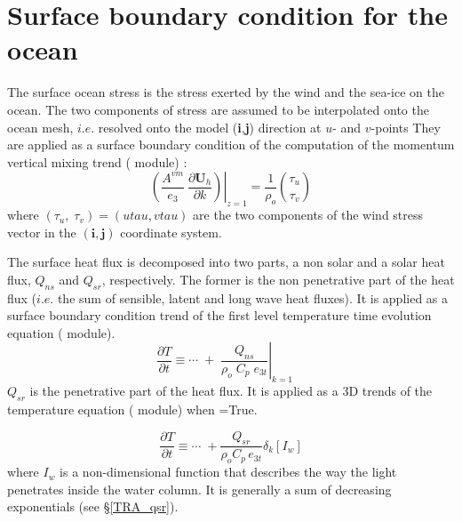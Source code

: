 \section{Surface boundary condition for the ocean}
\label{SBC_general}

The surface ocean stress is the stress exerted by the wind and the sea-ice 
on the ocean. The two components of stress are assumed to be interpolated 
onto the ocean mesh, $i.e.$ resolved onto the model (\textbf{i},\textbf{j}) direction 
at $u$- and $v$-points They are applied as a surface boundary condition of the 
computation of the momentum vertical mixing trend ( module) :
\begin{equation} \label{Eq_sbc_dynzdf}
\left.{\left( {\frac{A^{vm} }{e_3 }\ \frac{\partial \textbf{U}_h}{\partial k}} \right)} \right|_{z=1}
	 = \frac{1}{\rho _o} \binom{\tau _u}{\tau _v }
\end{equation}
where $(\tau _u ,\;\tau _v )=(utau,vtau)$ are the two components of the wind 
stress vector in the $(\textbf{i},\textbf{j})$ coordinate system.

The surface heat flux is decomposed into two parts, a non solar and a solar heat 
flux, $Q_{ns}$ and $Q_{sr}$, respectively. The former is the non penetrative part 
of the heat flux ($i.e.$ the sum of sensible, latent and long wave heat fluxes). 
It is applied as a surface boundary condition trend of the first level temperature 
time evolution equation ( module). 
\begin{equation} \label{Eq_sbc_trasbc_q}
\frac{\partial T}{\partial t}\equiv \cdots \;+\;\left. {\frac{Q_{ns} }{\rho 
_o \;C_p \;e_{3t} }} \right|_{k=1} \quad
\end{equation}
$Q_{sr}$ is the penetrative part of the heat flux. It is applied as a 3D 
trends of the temperature equation ( module) when =True.

\begin{equation} \label{Eq_sbc_traqsr}
\frac{\partial T}{\partial t}\equiv \cdots \;+\frac{Q_{sr} }{\rho_o C_p \,e_{3t} }\delta _k \left[ {I_w } \right]
\end{equation}
where $I_w$ is a non-dimensional function that describes the way the light 
penetrates inside the water column. It is generally a sum of decreasing 
exponentials (see \S\ref{TRA_qsr}).

